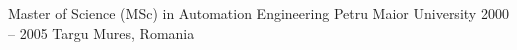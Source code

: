\cveducation
  {Master of Science (MSc) in Automation Engineering}
  {Petru Maior University}
  {2000 -- 2005}
  {Targu Mures, Romania}
  {}
